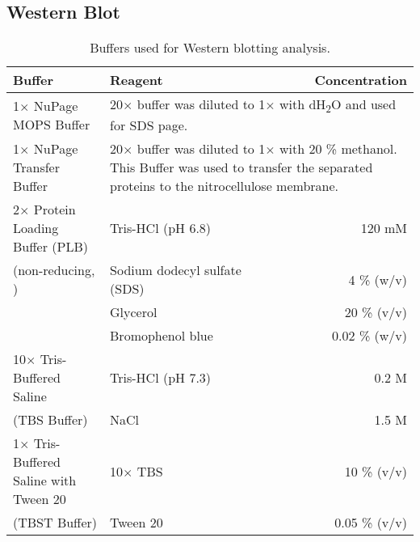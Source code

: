 \subsection{Western Blot}
\bigskip
\begin{table}[H]
\begin{center}
\captionsetup{justification=centering}
\caption[Western Blot Buffers]{Buffers used for Western blotting analysis.}
\vspace{.5cm}
\begin{tabular}{l l r}
\hline
\label{Western blot}
\textbf{Buffer} & \textbf{Reagent} & \textbf{Concentration}\Tstrut\Bstrut\\
\hline
1$\times$ NuPage MOPS Buffer & \multicolumn{2}{p{8cm}}{20$\times$ buffer was diluted to 1$\times$ with dH\textsubscript{2}O and used for SDS page.} \\ [0.3 cm]

1$\times$ NuPage Transfer Buffer & \multicolumn{2}{p{8cm}}{20$\times$ buffer was diluted to 1$\times$ with 20 \% methanol. This Buffer was used to transfer the separated proteins to the nitrocellulose membrane.} \\ [0.3 cm] 

2$\times$ Protein Loading Buffer (PLB) & Tris-HCl (pH 6.8) & 120 mM \\
(non-reducing, \cite{pmid5432063}) & Sodium dodecyl sulfate (SDS) & 4 \% (w/v)\\
& Glycerol & 20 \% (v/v) \\
& Bromophenol blue & 0.02 \% (w/v)\\ [0.3 cm]

10$\times$ Tris-Buffered Saline & Tris-HCl (pH 7.3) & 0.2 M \\
(TBS Buffer) & NaCl & 1.5 M \\ [0.3 cm]

1$\times$ Tris-Buffered Saline with Tween 20 & 10$\times$ TBS & 10 \% (v/v) \\
(TBST Buffer) & Tween 20 & 0.05 \% (v/v)\\[.8ex]
\hline
\end{tabular}
\end{center}
\end{table}



